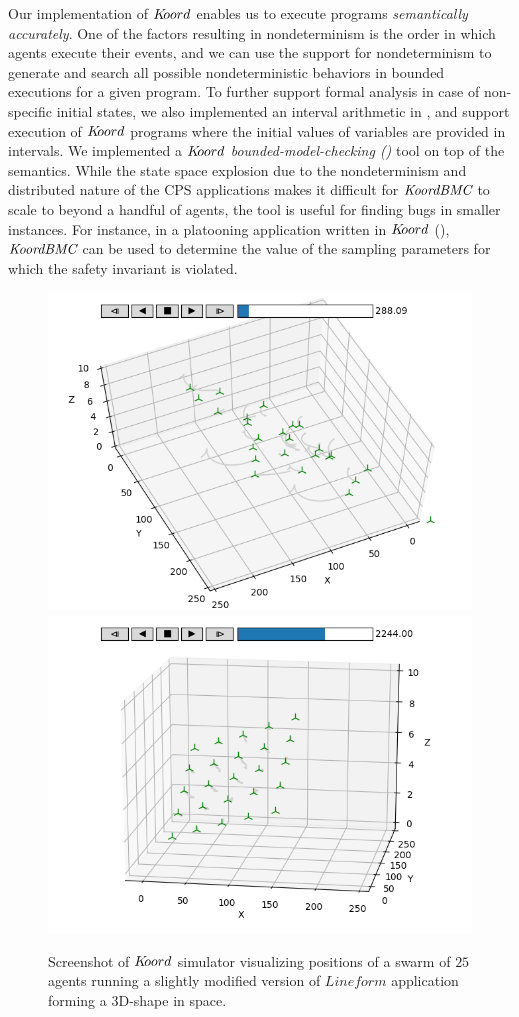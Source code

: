 Our \K implementation of $K\kern-2pt oord$ enables us to execute  programs \emph{semantically accurately}. One of the factors resulting in nondeterminism is the order in which agents execute their events, and we can use the \K support for nondeterminism to generate and search all possible nondeterministic behaviors in bounded executions for a given program. To further support formal analysis in case of non-specific initial states, we also implemented an interval arithmetic in \K, and support execution of $K\kern-2pt oord$ programs where the initial values of variables are provided in intervals. We implemented a {\em $K\kern-2pt oord$ bounded-model-checking (\kbmc)\/} tool on top of the \K semantics. While the state space explosion due to the nondeterminism and distributed nature of the CPS applications makes it difficult for $\emph{KoordBMC}$ to scale to beyond a handful of agents, the tool is useful for finding bugs in smaller instances. For instance, in a platooning application written in $K\kern-2pt oord$ (), $\emph{KoordBMC}$ can be used to determine the value of the sampling parameters for which the safety invariant is violated.

\begin{figure}[h!]
\begin{minipage}{0.5\textwidth}
\includegraphics[width=.5\textwidth]{figs/formation1.png}\hfill
\includegraphics[width=.5\textwidth]{figs/formation4.png}\hfill%
\end{minipage}%
\caption{Screenshot of $K\kern-2pt oord$ simulator visualizing positions of a swarm of $25$ agents running a slightly modified version of $\mathit{Lineform}$ application forming a 3D-shape in space.}
\label{fig:shapeplots}
\end{figure}

